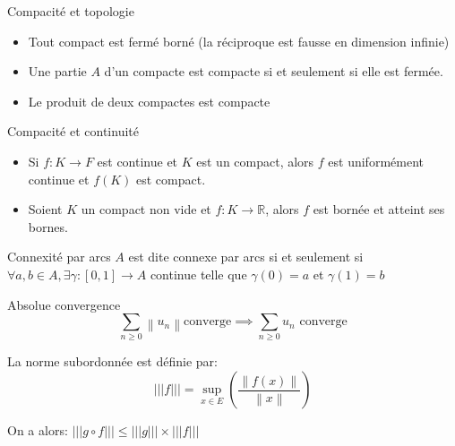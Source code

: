 \documentclass[french, a4paper, 11pt, twocolumn]{article}
\newcommand{\ssi}{si et seulement si\xspace}		%
\newcommand{\norme}[1]{\left\| #1\right\|}
\newcommand{\R}{\mathbb{R}}   %
\newcommand{\po}{\left(}         %
\newcommand{\pf}{\right)}        %
\newcommand{\pof}[1]{\po #1 \pf} %
\begin{document}
\begin{theoreme}{Compacité et topologie}
    \begin{itemize}[label=\(\bullet\)]
        \item Tout compact est fermé borné (la réciproque est fausse en dimension infinie)
        \item Une partie \(A\) d'un compacte est compacte \ssi elle est fermée.
        \item Le produit de deux compactes est compacte
    \end{itemize}
\end{theoreme}

\begin{theoreme}{Compacité et continuité}
    \begin{itemize}[label=\(\bullet\)]
        \item Si \(f : K \rightarrow F\) est continue et \(K\) est un compact, alors \(f\) est uniformément continue et \(f(K)\) est compact.
        \item Soient \(K\) un compact non vide et \(f : K \rightarrow \R\), alors \(f\) est bornée et atteint ses bornes.
    \end{itemize}
    
\end{theoreme}

\begin{theoreme}{Connexité par arcs}
    \(A\) est dite connexe par arcs \ssi \(\forall a,b \in A, \exists \gamma : [0,1] \rightarrow A\) continue telle que \(\gamma(0)=a\) et \(\gamma(1)=b\)
\end{theoreme}

\begin{theoreme}{Absolue convergence}
    \[\sum_{n \geq 0} \norme{u_n} \text{converge} \implies \sum_{n \geq 0} u_n \text{ converge}\]
\end{theoreme}

\begin{definition}
    La norme subordonnée est définie par:
    \[|||f|||=\underset{x \in E}{\sup}\pof{\dfrac{\norme{f(x)}}{\norme{x}}}\]

    On a alors: \(|||g \circ f||| \leq |||g||| \times |||f|||\)
\end{definition}
\end{document}
